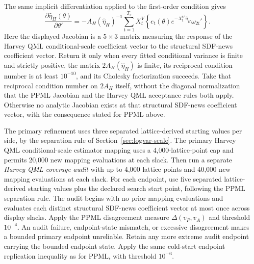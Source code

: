 \documentclass[11pt]{article}
\begin{document}
The same implicit differentiation applied to the first-order condition gives
\begin{equation*}
 \frac{\partial\widehat\eta_H(\theta)}{\partial\theta'}
 =-A_H(\widehat\eta_H)^{-1}
   \sum_{t=1}^{T_v}X_t^V
   \left\{e_t(\theta)e^{-X_t^{V\prime}\widehat\eta_H}\omega_{2t}'\right\}.
\end{equation*}
Here the displayed Jacobian is a \(5\times3\) matrix measuring the response of the Harvey QML
conditional-scale coefficient vector to the structural SDF-news coefficient vector. Return it only
when every fitted conditional variance is finite and strictly positive, the matrix
\(2A_H(\widehat\eta_H)\) is finite, its reciprocal condition number is at least \(10^{-10}\), and its
Cholesky factorization succeeds. Take that reciprocal condition number on \(2A_H\) itself, without
the diagonal normalization that the PPML Jacobian and the Harvey QML acceptance rules both apply.
Otherwise no analytic Jacobian exists at that structural SDF-news coefficient vector, with the
consequence stated for PPML above.

The primary refinement uses three separated lattice-derived starting values per side, by the
separation rule of Section~\ref{sec:logvar-scale}.
The primary Harvey QML conditional-scale estimator mapping uses a 4,000-lattice-point cap and permits
20,000 new mapping evaluations at each slack. Then run a separate \emph{Harvey QML coverage audit}
with up to 4,000 lattice points and 40,000 new mapping evaluations at each slack. For each endpoint,
use five separated lattice-derived starting values plus the declared search start point, following the
PPML separation rule. The audit begins with no prior mapping evaluations and evaluates each distinct
structural SDF-news coefficient vector at most once across display slacks. Apply the PPML disagreement measure \(\Delta(v_P,v_A)\) and threshold
\(10^{-4}\). An audit failure, endpoint-state mismatch, or excessive disagreement makes a bounded
primary endpoint unreliable. Retain any more extreme audit endpoint carrying the bounded endpoint state. Apply the
same cold-start endpoint replication inequality as for PPML, with threshold \(10^{-6}\).
\end{document}
